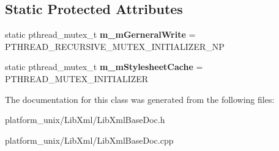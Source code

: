 \subsection*{\-Static \-Protected \-Attributes}
\begin{DoxyCompactItemize}
\item 
\hypertarget{classgeneral__server_1_1LibXmlBaseDoc_a1a73e25f56333b45c00fceaae3a59549}{static pthread\-\_\-mutex\-\_\-t {\bfseries m\-\_\-m\-Gerneral\-Write} = \-P\-T\-H\-R\-E\-A\-D\-\_\-\-R\-E\-C\-U\-R\-S\-I\-V\-E\-\_\-\-M\-U\-T\-E\-X\-\_\-\-I\-N\-I\-T\-I\-A\-L\-I\-Z\-E\-R\-\_\-\-N\-P}\label{classgeneral__server_1_1LibXmlBaseDoc_a1a73e25f56333b45c00fceaae3a59549}

\item 
\hypertarget{classgeneral__server_1_1LibXmlBaseDoc_a044dbe9180d948b827e038ebad3844ad}{static pthread\-\_\-mutex\-\_\-t {\bfseries m\-\_\-m\-Stylesheet\-Cache} = \-P\-T\-H\-R\-E\-A\-D\-\_\-\-M\-U\-T\-E\-X\-\_\-\-I\-N\-I\-T\-I\-A\-L\-I\-Z\-E\-R}\label{classgeneral__server_1_1LibXmlBaseDoc_a044dbe9180d948b827e038ebad3844ad}

\end{DoxyCompactItemize}


\-The documentation for this class was generated from the following files\-:\begin{DoxyCompactItemize}
\item 
platform\-\_\-unix/\-Lib\-Xml/\-Lib\-Xml\-Base\-Doc.\-h\item 
platform\-\_\-unix/\-Lib\-Xml/\-Lib\-Xml\-Base\-Doc.\-cpp\end{DoxyCompactItemize}
